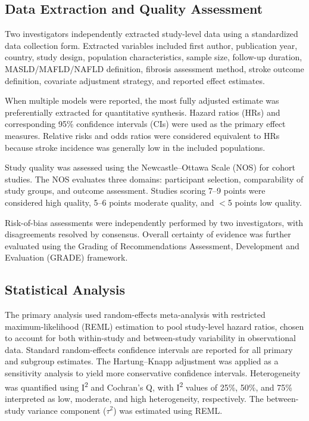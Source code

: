 \documentclass[12pt,a4paper]{article}
\begin{document}
\subsection{Data Extraction and Quality Assessment}

Two investigators independently extracted study-level data using a standardized data collection form. Extracted variables included first author, publication year, country, study design, population characteristics, sample size, follow-up duration, MASLD/MAFLD/NAFLD definition, fibrosis assessment method, stroke outcome definition, covariate adjustment strategy, and reported effect estimates.

When multiple models were reported, the most fully adjusted estimate was preferentially extracted for quantitative synthesis. Hazard ratios (HRs) and corresponding 95\% confidence intervals (CIs) were used as the primary effect measures. Relative risks and odds ratios were considered equivalent to HRs because stroke incidence was generally low in the included populations.

Study quality was assessed using the Newcastle--Ottawa Scale (NOS) for cohort studies. The NOS evaluates three domains: participant selection, comparability of study groups, and outcome assessment. Studies scoring 7--9 points were considered high quality, 5--6 points moderate quality, and $<$5 points low quality.

Risk-of-bias assessments were independently performed by two investigators, with disagreements resolved by consensus. Overall certainty of evidence was further evaluated using the Grading of Recommendations Assessment, Development and Evaluation (GRADE) framework.

\subsection{Statistical Analysis}

The primary analysis used random-effects meta-analysis with restricted maximum-likelihood (REML) estimation to pool study-level hazard ratios, chosen to account for both within-study and between-study variability in observational data. Standard random-effects confidence intervals are reported for all primary and subgroup estimates. The Hartung--Knapp adjustment was applied as a sensitivity analysis to yield more conservative confidence intervals. Heterogeneity was quantified using I\textsuperscript{2} and Cochran's Q, with I\textsuperscript{2} values of 25\%, 50\%, and 75\% interpreted as low, moderate, and high heterogeneity, respectively. The between-study variance component ($\tau^2$) was estimated using REML.
\end{document}

